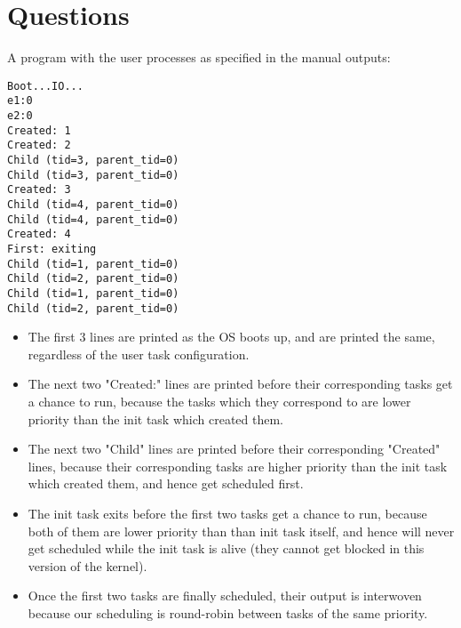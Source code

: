 \documentclass[titlepage]{article}
\begin{document}
\section{Questions}
A program with the user processes as specified in the manual outputs:
\begin{verbatim}
Boot...IO...
e1:0
e2:0
Created: 1
Created: 2
Child (tid=3, parent_tid=0)
Child (tid=3, parent_tid=0)
Created: 3
Child (tid=4, parent_tid=0)
Child (tid=4, parent_tid=0)
Created: 4
First: exiting
Child (tid=1, parent_tid=0)
Child (tid=2, parent_tid=0)
Child (tid=1, parent_tid=0)
Child (tid=2, parent_tid=0)
\end{verbatim}
\begin{itemize}
\item The first 3 lines are printed as the OS boots up, and are printed the
	same, regardless of the user task configuration.
\item The next two "Created:" lines are printed before their corresponding
	tasks get a chance to run, because the tasks which they correspond to
	are lower priority than the init task which created them.
\item The next two "Child" lines are printed before their corresponding
	"Created" lines, because their corresponding tasks are higher priority
	than the init task which created them, and hence get scheduled first.
\item The init task exits before the first two tasks get a chance to run,
	because both of them are lower priority than than init task itself, and
	hence will never get scheduled while the init task is alive (they cannot
	get blocked in this version of the kernel).
\item Once the first two tasks are finally scheduled, their output is
	interwoven because our scheduling is round-robin between tasks of the
	same priority.
\end{itemize}
\end{document}
